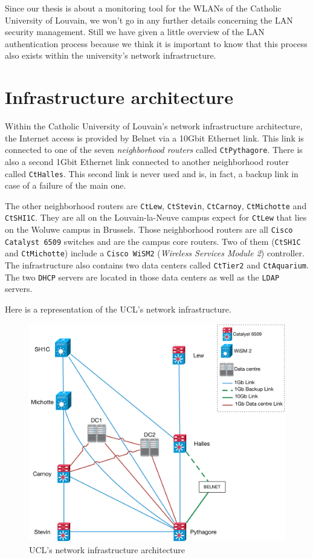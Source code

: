 Since our thesis is about a monitoring tool for the WLANs of the Catholic University of Louvain, we won't go in any further details concerning the LAN security management. 
Still we have given a little overview of the LAN authentication process because we think it is important to know that this process also exists within the university's network infrastructure.


\section{Infrastructure architecture}
Within the Catholic University of Louvain's network infrastructure architecture, the Internet access is provided by Belnet via a 10Gbit Ethernet link. This link is connected to one of the seven \textit{neighborhood routers} called \texttt{CtPythagore}. There is also a second 1Gbit Ethernet link connected to another neighborhood router called \texttt{CtHalles}. This second link is never used and is, in fact, a backup link in case of a failure of the main one.

The other neighborhood routers are \texttt{CtLew}, \texttt{CtStevin}, \texttt{CtCarnoy}, \texttt{CtMichotte} and \texttt{CtSHI1C}. They are all on the Louvain-la-Neuve campus expect for \texttt{CtLew} that lies on the Woluwe campus in Brussels. Those neighborhood routers are all \texttt{Cisco Catalyst 6509} switches and are the campus core routers. Two of them (\texttt{CtSH1C} and \texttt{CtMichotte}) include a \texttt{Cisco WiSM2} (\textit{Wireless Services Module 2}) controller. The infrastructure also contains two data centers called \texttt{CtTier2} and \texttt{CtAquarium}. The two \texttt{DHCP} servers are located in those data centers as well as the \texttt{LDAP} servers.

Here is a representation of the UCL's network infrastructure.

\begin{figure}[H]
	\includegraphics[width=1\linewidth]{Pictures/Chapter2/ucl.png}
	\caption{UCL's network infrastructure architecture}
\end{figure}


